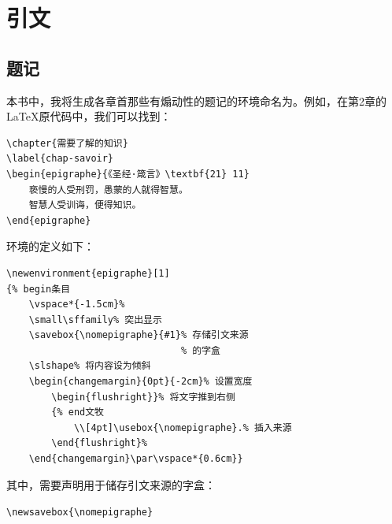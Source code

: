 \section{引文}

\subsection{题记}

本书中，我将生成各章首那些有煽动性的题记的环境命名为。例如，在第2章的\LaTeX 原代码中，我们可以找到：

\begin{dmd}
\begin{verbatim}
\chapter{需要了解的知识}
\label{chap-savoir}
\begin{epigraphe}{《圣经·箴言》\textbf{21} 11}
    亵慢的人受刑罚，愚蒙的人就得智慧。
    智慧人受训诲，便得知识。
\end{epigraphe}
\end{verbatim}
\end{dmd}

环境的定义如下：

\begin{dmd}
\begin{verbatim}
\newenvironment{epigraphe}[1] 
{% begin条目
    \vspace*{-1.5cm}%
    \small\sffamily% 突出显示
    \savebox{\nomepigraphe}{#1}% 存储引文来源
                               % 的字盒
    \slshape% 将内容设为倾斜
    \begin{changemargin}{0pt}{-2cm}% 设置宽度
        \begin{flushright}}% 将文字推到右侧
        {% end文牧
            \\[4pt]\usebox{\nomepigraphe}.% 插入来源
        \end{flushright}%
    \end{changemargin}\par\vspace*{0.6cm}}
\end{verbatim}
\end{dmd}

其中，需要声明用于储存引文来源的字盒：

\begin{dmd}
\verb|\newsavebox{\nomepigraphe}|
\end{dmd}

